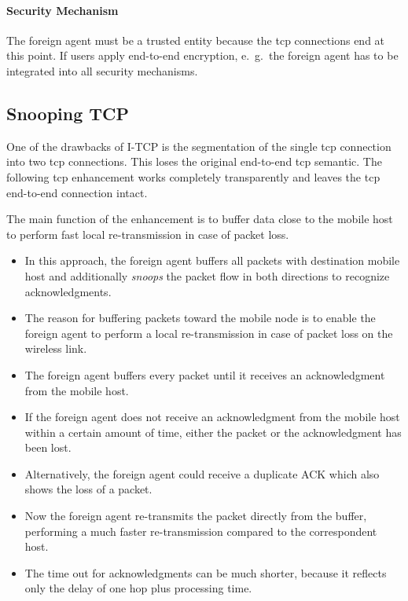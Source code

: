  \paragraph*{Security Mechanism}
 The foreign agent must be a trusted entity because the \gls{tcp} connections
 end at this point. If users apply end-to-end encryption, e.\ g.\, the foreign agent has to be integrated into all security mechanisms.
 

\subsection{Snooping TCP}
One of the drawbacks of I-TCP is the segmentation of the single \gls{tcp} connection into two \gls{tcp} connections. This loses the original end-to-end \gls{tcp} semantic. The following \gls{tcp} enhancement works completely transparently and leaves the \gls{tcp} end-to-end connection intact.

The main function of the enhancement is to buffer data close to the mobile host to perform fast local re-transmission in case of packet loss.

\begin{itemize}
	\item In this approach, the foreign agent buffers all packets with destination
	mobile host and additionally \textit{snoops} the packet flow in both directions to recognize acknowledgments.
	\item The reason for buffering packets toward the mobile node is to enable the foreign agent to perform a local re-transmission in case of packet loss on the wireless link. 
	\item The foreign agent buffers every packet until it receives an acknowledgment from the mobile host.
	\item If the foreign agent does not receive an acknowledgment from the mobile host within a certain amount of time, either the packet or the acknowledgment has been lost.
	\item Alternatively, the foreign agent could receive a duplicate ACK which also shows the loss of a packet.
	\item Now the foreign agent re-transmits the packet directly from the buffer, performing a much faster re-transmission compared to the correspondent host. 
	\item The time out for acknowledgments can be much shorter, because it reflects only the delay of one hop plus processing time.
	
\end{itemize}


